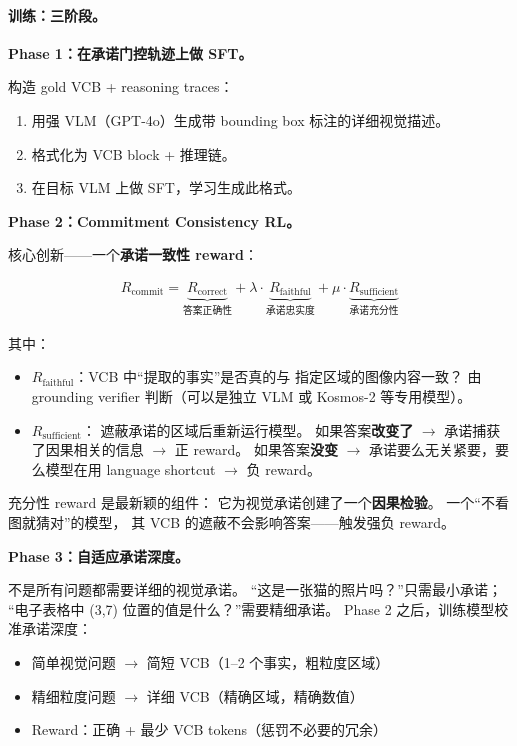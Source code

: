 \documentclass[12pt,a4paper]{article}
\begin{document}
\paragraph{训练：三阶段。}

\textbf{Phase 1：在承诺门控轨迹上做 SFT。}

构造 gold VCB + reasoning traces：
\begin{enumerate}[leftmargin=2em]
  \item 用强 VLM（GPT-4o）生成带 bounding box 标注的详细视觉描述。
  \item 格式化为 VCB block + 推理链。
  \item 在目标 VLM 上做 SFT，学习生成此格式。
\end{enumerate}

\textbf{Phase 2：Commitment Consistency RL。}

核心创新——一个\textbf{承诺一致性 reward}：

\begin{align}
R_{\text{commit}} =
  \underbrace{R_{\text{correct}}}_{\text{答案正确性}}
  + \lambda \cdot \underbrace{R_{\text{faithful}}}_{\text{承诺忠实度}}
  + \mu \cdot \underbrace{R_{\text{sufficient}}}_{\text{承诺充分性}}
\end{align}

其中：
\begin{itemize}[leftmargin=2em]
  \item $R_{\text{faithful}}$：VCB 中``提取的事实''是否真的与
    指定区域的图像内容一致？
    由 grounding verifier 判断（可以是独立 VLM 或 Kosmos-2 等专用模型）。
  \item $R_{\text{sufficient}}$：
    遮蔽承诺的区域后重新运行模型。
    如果答案\textbf{改变了}
    $\rightarrow$ 承诺捕获了因果相关的信息
    $\rightarrow$ 正 reward。
    如果答案\textbf{没变}
    $\rightarrow$ 承诺要么无关紧要，要么模型在用 language shortcut
    $\rightarrow$ 负 reward。
\end{itemize}

\noindent
充分性 reward 是最新颖的组件：
它为视觉承诺创建了一个\textbf{因果检验}。
一个``不看图就猜对''的模型，
其 VCB 的遮蔽不会影响答案——触发强负 reward。

\textbf{Phase 3：自适应承诺深度。}

不是所有问题都需要详细的视觉承诺。
``这是一张猫的照片吗？''只需最小承诺；
``电子表格中 (3,7) 位置的值是什么？''需要精细承诺。
Phase 2 之后，训练模型校准承诺深度：

\begin{itemize}[leftmargin=2em]
  \item 简单视觉问题 $\rightarrow$ 简短 VCB（1--2 个事实，粗粒度区域）
  \item 精细粒度问题 $\rightarrow$ 详细 VCB（精确区域，精确数值）
  \item Reward：正确 + 最少 VCB tokens（惩罚不必要的冗余）
\end{itemize}
\end{document}
